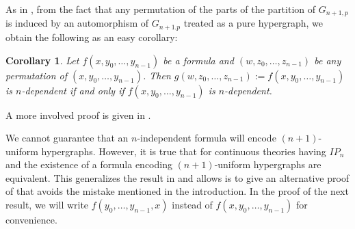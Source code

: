 \documentclass{amsart}
\newtheorem{cor}[teor]{Corollary}
\newtheorem{external claim}[teor]{Claim}
\begin{document}
As in \cite[Corollary 5.3]{Chernikov2014OnN}, from the fact that any permutation of the parts of the partition of $G_{n+1,p}$ is induced by an automorphism of $G_{n+1.p}$ treated as a pure hypergraph, we obtain the following as an easy corollary:

\begin{cor}\label{Corolary: preservation under permutation of variables}
    Let $f(x,y_0,\dots,y_{n-1})$ be a formula and $(w,z_0,\dots,z_{n-1} )$ be any permutation of $(x,y_0,\dots,y_{n-1})$. Then $g(w,z_0,\dots,z_{n-1} ):= f(x,y_0,\dots,y_{n-1})$ is $n$-dependent if and only if $f(x,y_0,\dots,y_{n-1})$ is $n$-dependent.
\end{cor}

A more involved proof is given in \cite[Proposition 10.6]{Chernikov2020HypergraphRA}.

We cannot guarantee that an $n$-independent formula will encode $(n+1)$-uniform hypergraphs. However, it is true that for continuous theories having $IP_n$ and the existence of a formula encoding $(n+1)$-uniform hypergraphs are equivalent. This generalizes the result in \cite[Lemma 2.2]{LASKOWSKI2003263} and allows is to give an alternative proof of \cite[Theorem 5.4]{Chernikov2014OnN} that avoids the mistake mentioned in the introduction. In the proof of the next result, we will write $f(y_0,\dots,y_{n-1},x)$ instead of $f(x,y_0,\dots,y_{n-1})$ for convenience.
\end{document}
